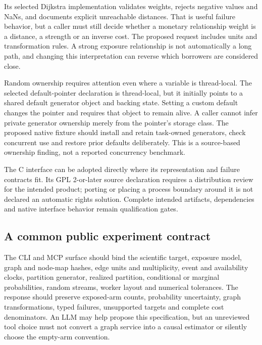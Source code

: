 Its selected Dijkstra implementation validates weights, rejects negative values and NaNs, and documents explicit unreachable distances. That is useful failure behavior, but a caller must still decide whether a monetary relationship weight is a distance, a strength or an inverse cost. The proposed request includes units and transformation rules. A strong exposure relationship is not automatically a long path, and changing this interpretation can reverse which borrowers are considered close.\citep{exec25_cnet_igraph,exec25_cnet_choice}

Random ownership requires attention even where a variable is thread-local. The selected default-pointer declaration is thread-local, but it initially points to a shared default generator object and backing state. Setting a custom default changes the pointer and requires that object to remain alive. A caller cannot infer private generator ownership merely from the pointer's storage class. The proposed native fixture should install and retain task-owned generators, check concurrent use and restore prior defaults deliberately. This is a source-based ownership finding, not a reported concurrency benchmark.\citep{exec25_cnet_igraph}

The C interface can be adopted directly where its representation and failure contracts fit. Its GPL 2-or-later source declaration requires a distribution review for the intended product; porting or placing a process boundary around it is not declared an automatic rights solution. Complete intended artifacts, dependencies and native interface behavior remain qualification gates.\citep{exec25_cnet_igraph,exec25_cnet_choice}

\subsection{A common public experiment contract}

The CLI and MCP surface should bind the scientific target, exposure model, graph and node-map hashes, edge units and multiplicity, event and availability clocks, partition generator, realized partition, conditional or marginal probabilities, random streams, worker layout and numerical tolerances. The response should preserve exposed-arm counts, probability uncertainty, graph transformations, typed failures, unsupported targets and complete cost denominators. An LLM may help propose this specification, but an unreviewed tool choice must not convert a graph service into a causal estimator or silently choose the empty-arm convention.\citep{exec25_cnet_choice}

